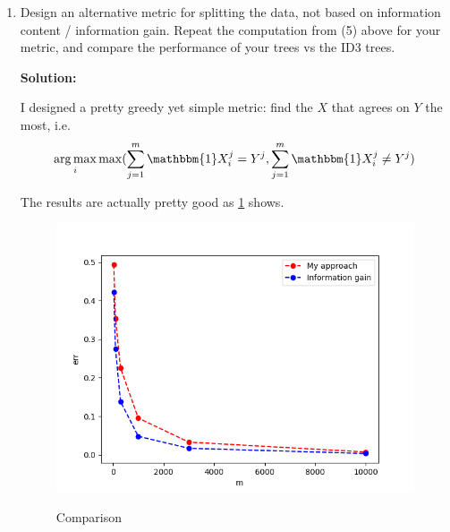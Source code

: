 \documentclass[letter, 12pt]{article}
\DeclareMathOperator*{\argmax}{arg\,max}
\begin{document}
\begin{enumerate}
        \item {Design an alternative metric for splitting the data, not based on information content / information gain. Repeat
        	the computation from (5) above for your metric, and compare the performance of your trees vs the ID3 trees.}
        \par{\textbf{Solution:}}
        \par{I designed a pretty greedy yet simple metric: find the $ X $ that agrees on $ Y $ the most, i.e. \[ \argmax_{i} \max (\sum_{j=1}^{m}\mathbbm{1}X^j_i = Y^j, \sum_{j=1}^{m}\mathbbm{1}X^j_i \ne Y^j) \]}
        \par{The results are actually pretty good as \ref{fig:q6} shows.}
        \begin{figure}[H]
        	\centering
        	\includegraphics[width=\textwidth]{q6.png}
        	\label{fig:q6}
        	\caption{Comparison}
        \end{figure}
    \end{enumerate}
\end{document}

